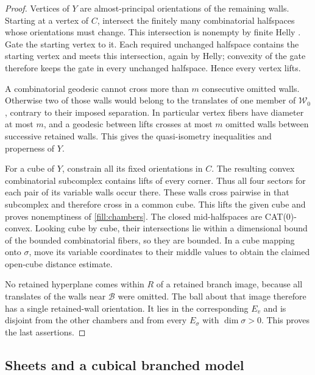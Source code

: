 \begin{proof}
Vertices of \(Y\) are almost-principal orientations of the remaining
walls.  Starting at a vertex of \(C\), intersect the finitely many
combinatorial halfspaces whose orientations must change.  This
intersection is nonempty by finite Helly
\cite[Theorem~2.2]{Roller1998}. Gate the starting vertex to
it.  Each required unchanged halfspace contains the starting vertex and
meets this intersection, again by Helly; convexity of the gate
\cite[Lemma~2.11 and Theorem~8.2]{Roller1998} therefore
keeps the gate in every unchanged halfspace.  Hence every vertex lifts.

A combinatorial geodesic cannot cross more than \(m\) consecutive omitted
walls.  Otherwise two of those walls would belong to the translates of
one member of \(\mathcal W_0\), contrary to their imposed separation.
In particular vertex fibers have diameter at most \(m\), and a geodesic
between lifts crosses at most \(m\) omitted walls between successive
retained walls.  This gives the quasi-isometry inequalities and properness
of \(Y\).

For a cube of \(Y\), constrain all its fixed orientations in \(C\).
The resulting convex combinatorial subcomplex contains lifts of every
corner.  Thus all four sectors for each pair of its variable walls occur
there.  These walls cross pairwise in that subcomplex and therefore
cross in a common cube.  This lifts the given cube and proves
nonemptiness of \eqref{fill:chambers}.  The closed mid-halfspaces are
CAT(0)-convex.  Looking cube by cube, their intersections lie within a
dimensional bound of the bounded combinatorial fibers, so they are
bounded.  In a cube mapping onto \(\sigma\), move its variable
coordinates to their middle values to obtain the claimed
open-cube distance estimate.

No retained hyperplane comes within \(R\) of a retained branch image,
because all translates of the walls near \(\mathcal B\) were omitted.
The ball about that image therefore has a single retained-wall
orientation.  It lies in the corresponding \(E_v\) and is disjoint from
the other chambers and from every \(E_\sigma\) with \(\dim\sigma>0\).
This proves the last assertions.
\end{proof}

\subsection{Sheets and a cubical branched model}

